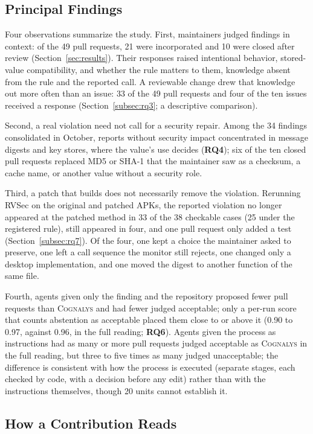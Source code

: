 \documentclass[conference]{IEEEtran}
\newcommand{\system}{\textsc{Cognalys}}
\newcommand{\researchq}[1]{\textbf{RQ#1}}
\begin{document}
\subsection{Principal Findings}

Four observations summarize the study. First, maintainers judged findings in
context: of the 49 pull requests, 21 were incorporated and 10 were closed
after review (Section~\ref{sec:results}). Their responses raised intentional
behavior, stored-value compatibility, and whether the rule matters to them,
knowledge absent from the rule and the reported call. A reviewable change
drew that knowledge out more often than an issue: 33 of the 49 pull requests
and four of the ten issues received a response (Section~\ref{subsec:rq3}; a
descriptive comparison).

Second, a real violation need not call for a security repair. Among the 34
findings consolidated in October, reports without security impact concentrated
in message digests and key stores, where the value's use decides
(\researchq{4}); six of the ten closed pull requests replaced MD5 or SHA-1 that
the maintainer saw as a checksum, a cache name, or another value without a
security role.

Third, a patch that builds does not necessarily remove the violation.
Rerunning RVSec on the original and patched APKs, the reported violation
no longer appeared at the patched method in 33 of the 38 checkable cases
(25 under the registered rule), still appeared in four, and one pull request only added a test
(Section~\ref{subsec:rq7}). Of the four, one kept a choice the maintainer asked
to preserve, one left a call sequence the monitor still rejects, one changed
only a desktop implementation, and one moved the digest to another function of
the same file.

Fourth, agents given only the finding and the repository proposed fewer pull
requests than \system{} and had fewer judged acceptable; only a per-run score
that counts abstention as acceptable placed them close to or above it (0.90 to
0.97, against 0.96, in the full reading; \researchq{6}). Agents given the process as instructions
had as many or more pull requests judged acceptable as \system{} in the
full reading, but three to five times as many judged unacceptable; the difference is consistent with how the
process is executed (separate stages, each checked by code, with a decision
before any edit) rather than with the instructions themselves, though 20 units cannot
establish it.

\subsection{How a Contribution Reads}
\label{subsec:form}
\end{document}
